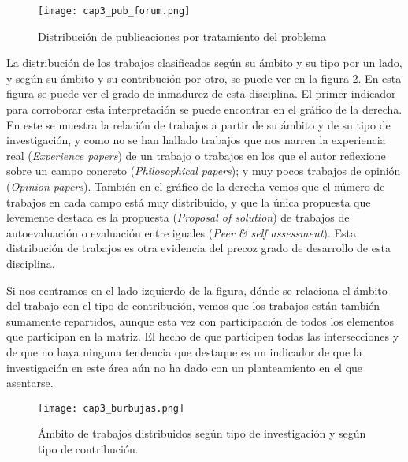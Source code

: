 \begin{figure}[H]
  \begin{center}
    \texttt{[image: cap3\_pub\_forum.png]}
  \end{center}
  \caption{Distribución de publicaciones por tratamiento del problema}
  \label{fig:PublicacionesForum}
\end{figure}


La distribución de los trabajos clasificados según su ámbito y su tipo por un lado, y según su ámbito y su contribución por otro, se puede ver en la figura \ref{fig:Burble}. En esta figura se puede ver el grado de inmadurez de esta disciplina. El primer indicador para corroborar esta interpretación se puede encontrar en el gráfico de la derecha. En este se muestra la relación de trabajos a partir de su ámbito y de su tipo de investigación, y como no se han hallado trabajos que nos narren la experiencia real (\emph{Experience papers}) de un trabajo o trabajos en los que el autor reflexione sobre un campo concreto (\emph{Philosophical papers}); y muy pocos trabajos de opinión (\emph{Opinion papers}). También en el gráfico de la derecha vemos que el número de trabajos en cada campo está muy distribuido, y que la única propuesta que levemente destaca es la propuesta (\emph{Proposal of solution}) de trabajos de autoevaluación o evaluación entre iguales (\emph{Peer \& self assessment}). Esta distribución de trabajos es otra evidencia del precoz grado de desarrollo de esta disciplina.

Si nos centramos en el lado izquierdo de la figura, dónde se relaciona el ámbito del trabajo con el tipo de contribución, vemos que los trabajos están también sumamente repartidos, aunque esta vez con participación de todos los elementos que participan en la matriz. El hecho de que participen todas las intersecciones y de que no haya ninguna tendencia que destaque es un indicador de que la investigación en este área aún no ha dado con un planteamiento en el que asentarse.


\begin{landscape}
\pagestyle{apaisado}
\begin{figure}[H]
  \begin{center}
    \texttt{[image: cap3\_burbujas.png]}
  \end{center}
  \caption{Ámbito de trabajos distribuidos según tipo de investigación y según tipo de contribución.}
  \label{fig:Burble}
\end{figure}
\end{landscape}
\pagestyle{normal}

